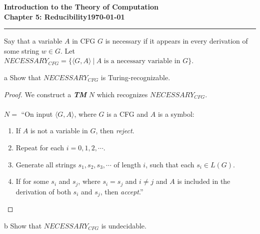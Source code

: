 \documentclass[11pt]{article}
\newcommand{\dated}{\today}
\begin{document}
\textbf{Introduction to the Theory of
Computation}\hfill\textbf{\myname}\\[0.01in]
\textbf{Chapter 5: Reducibility}\hfill\textbf{\dated}\\
\smallskip\hrule\bigskip

\begin{problem}{5.35}
Say that a variable $A$ in CFG $G$ is necessary if it appears in every derivation of some string $w \in G$. Let $NECESSARY_{CFG} = \{\langle G, A \rangle \ | \ A \text{ is a necessary variable in } G\}$.
\end{problem}

\begin{problem}[Part]{a}
Show that $NECESSARY_{CFG}$ is Turing-recognizable.
\end{problem}

\begin{proof}
We construct a \textbf{\textit{TM}} $N$ which recognizes $NECESSARY_{CFG}$. \\
\\
$N =$ \textquotedblleft On input $\langle G, A \rangle$, where $G$ is a CFG and $A$ is a symbol:
\begin{enumerate}
\item If $A$ is not a variable in $G$, then \textit{reject}.
\item Repeat for each $i = 0, 1, 2, \cdots$.
\item \hspace*{0.5cm} Generate all strings $s_1, s_2, s_3, \cdots$ of length $i$, such that each $s_i \in L(G)$.
\item \hspace*{0.5cm} If for some $s_i$ and $s_j$, where $s_i = s_j$ and $i \neq j$ and $A$ is included in the \\
\hspace*{0.5cm} derivation of both $s_i$ and $s_j$, then \textit{accept}.\textquotedblright
\end{enumerate}
\end{proof}

\begin{problem}[Part]{b}
Show that $NECESSARY_{CFG}$ is undecidable.
\end{problem}
\end{document}
